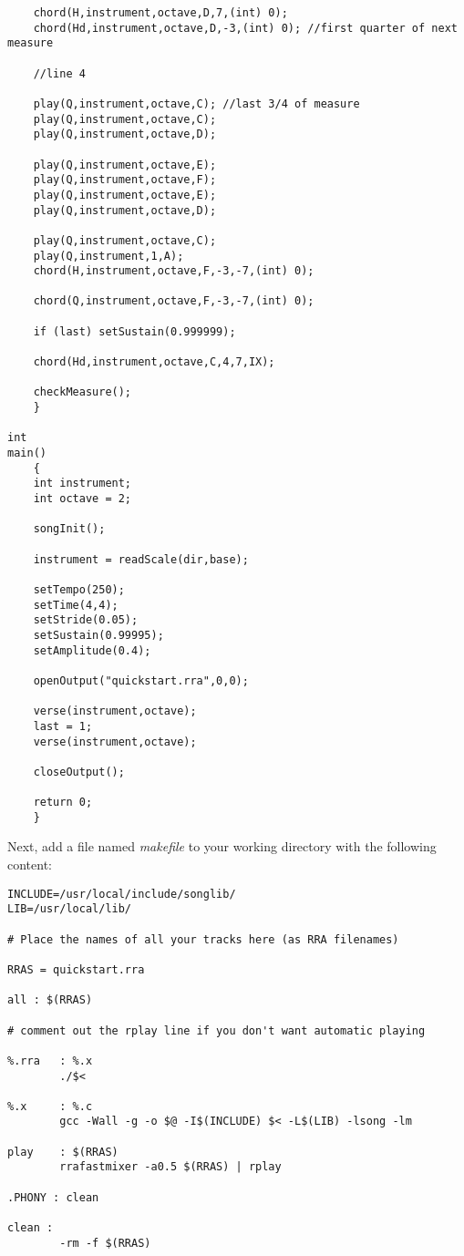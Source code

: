 \documentclass{article}
\begin{document}
\begin{verbatim}
    chord(H,instrument,octave,D,7,(int) 0);
    chord(Hd,instrument,octave,D,-3,(int) 0); //first quarter of next measure

    //line 4

    play(Q,instrument,octave,C); //last 3/4 of measure
    play(Q,instrument,octave,C);
    play(Q,instrument,octave,D);

    play(Q,instrument,octave,E);
    play(Q,instrument,octave,F);
    play(Q,instrument,octave,E);
    play(Q,instrument,octave,D);

    play(Q,instrument,octave,C);
    play(Q,instrument,1,A);
    chord(H,instrument,octave,F,-3,-7,(int) 0);

    chord(Q,instrument,octave,F,-3,-7,(int) 0);

    if (last) setSustain(0.999999);

    chord(Hd,instrument,octave,C,4,7,IX);

    checkMeasure();
    }

int
main()
    {
    int instrument;
    int octave = 2;

    songInit();

    instrument = readScale(dir,base);

    setTempo(250);
    setTime(4,4);
    setStride(0.05);
    setSustain(0.99995);
    setAmplitude(0.4);

    openOutput("quickstart.rra",0,0);

    verse(instrument,octave);
    last = 1;
    verse(instrument,octave);

    closeOutput();

    return 0;
    }
\end{verbatim}

Next, add a file named {\it makefile} to your working directory with the
following content:

\begin{verbatim}
INCLUDE=/usr/local/include/songlib/
LIB=/usr/local/lib/

# Place the names of all your tracks here (as RRA filenames)

RRAS = quickstart.rra

all : $(RRAS)

# comment out the rplay line if you don't want automatic playing

%.rra   : %.x
        ./$<

%.x     : %.c
		gcc -Wall -g -o $@ -I$(INCLUDE) $< -L$(LIB) -lsong -lm 

play    : $(RRAS)
        rrafastmixer -a0.5 $(RRAS) | rplay

.PHONY : clean

clean :
        -rm -f $(RRAS)
\end{verbatim}
\end{document}
